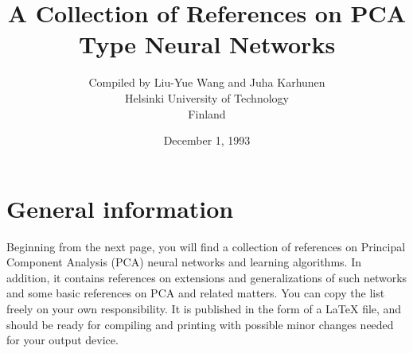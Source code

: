 %
%
%
%
\textwidth=17cm
\textheight=24cm
\topmargin=0cm
\topskip=0.3cm
\headheight=0cm
\headsep=0cm
\oddsidemargin=-1cm
\footskip=0.5cm
\def\Romannumeral#1{\uppercase{\expandafter\romannumeral#1}}
%

\title{A Collection of References on PCA Type Neural Networks}
\author{Compiled by Liu-Yue Wang and Juha Karhunen\\Helsinki 
University of Technology \\Finland}
\date{December 1, 1993}
\maketitle
%
\section*{General information}
Beginning from the next page, you will find
a collection of references on Principal Component Analysis (PCA)
neural networks and learning algorithms. In addition, it contains
references on extensions and generalizations of such networks and some
basic references on PCA and related matters. You can copy the
list freely on your own responsibility. It is published
in the form of a LaTeX file, and should be ready for compiling and 
printing with
possible minor changes needed for your output device.

